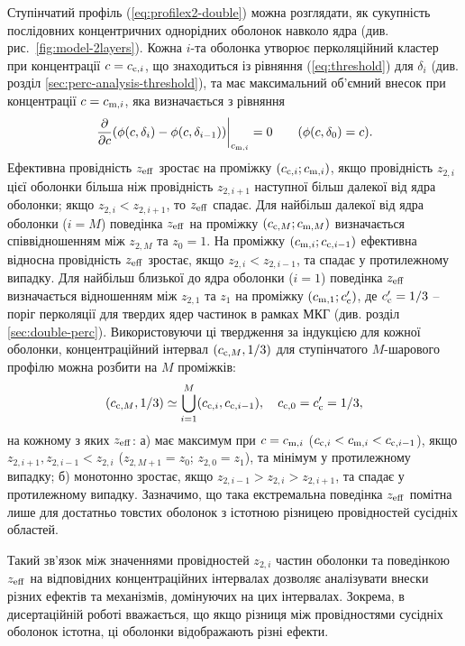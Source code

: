 \documentclass[14pt,twoside]{vakthesis}
\begin{document}
Ступінчатий профіль (\ref{eq:profilex2-double}) можна розглядати, як сукупність послідовних концентричних однорідних оболонок навколо ядра (див. рис.~\ref{fig:model-2layers}). Кожна $i$-та оболонка утворює перколяційний кластер при концентрації $c = c_{{\rm c},i}$, що знаходиться із рівняння (\ref{eq:threshold}) для $\delta_i$ (див. розділ \ref{sec:perc-analysis-threshold}), та має максимальний об'ємний внесок при концентрації $c = c_{{\rm m},i}$, яка визначається з рівняння 
$$
\left. \frac{\partial }{\partial c} (\phi(c,\delta_{i}) - \phi(c,\delta_{i-1})) \right|_{c_{{\rm m},i}} = 0 
\qquad (\phi(c, \delta_0) = c).
$$
Ефективна провідність ${z}_{\rm eff}$ зростає на проміжку $(c_{{\rm c},i}; c_{{\rm m},i})$, якщо провідність ${z}_{2,i}$ цієї оболонки більша ніж провідність ${z}_{2,i+1}$ наступної більш далекої від ядра оболонки; якщо ${z}_{2,i} < {z}_{2,i+1}$, то ${z}_{\rm eff}$ спадає. Для найбільш далекої від ядра оболонки ($i=M$) поведінка ${z}_{\rm eff}$ на проміжку $(c_{{\rm c},M}; c_{{\rm m},M})$ визначається співвідношенням між ${z}_{2,M}$ та ${z}_0 = 1$.
На проміжку $(c_{{\rm m},i}; c_{{\rm c},i-1})$ ефективна відносна провідність ${z}_{\rm eff}$ зростає, якщо ${z}_{2,i} < {z}_{2,i-1}$, та спадає у протилежному випадку. Для найбільш близької до ядра оболонки ($i=1$) поведінка $z_{\rm eff}$ визначається відношенням між ${z}_{2,1}$ та ${z}_1$ на проміжку $(c_{{\rm m},1}; c'_{{\rm c}})$, де $c_{\rm c}' = 1/3$ -- поріг перколяції для твердих ядер частинок в рамках МКГ (див. розділ \ref{sec:double-perc}).
Використовуючи ці твердження за індукцією для кожної оболонки, концентраційний інтервал $(c_{{\rm c},M}, 1/3)$ для ступінчатого $M$-шарового профілю можна розбити на $M$ проміжків: 
$$
(c_{{\rm c},M}, 1/3) \simeq \bigcup\limits_{i=1}^M (c_{{\rm c},i}, c_{{\rm c},i-1}), \quad c_{{\rm c},0} = c'_{\rm c} = 1/3,
$$ 
на кожному з яких ${z}_{\rm eff}$: а) має максимум при $c=c_{{\rm m},i}$ ($c_{{\rm c},i} < c_{{\rm m},i} < c_{{\rm c},i-1}$), якщо ${z}_{2,i+1}, {z}_{2,i-1} < {z}_{2,i}$ (${z}_{2,M+1} = {z}_0$; ${z}_{2,0} = {z}_1$), та мінімум у протилежному випадку; б) монотонно зростає, якщо ${z}_{2,i-1} > {z}_{2,i} > {z}_{2,i+1}$, та спадає у протилежному випадку. Зазначимо, що така екстремальна поведінка ${z}_{\rm eff}$ помітна лише для достатньо товстих оболонок з істотною різницею провідностей сусідніх областей.

Такий зв'язок між значеннями провідностей ${z}_{2,i}$ частин оболонки та поведінкою ${z}_{\rm eff}$ на відповідних концентраційних інтервалах дозволяє аналізувати внески різних ефектів та механізмів, домінуючих на цих інтервалах. Зокрема, в дисертаційній роботі вважається, що якщо різниця між провідностями сусідніх оболонок істотна, ці оболонки відображають різні ефекти.
\end{document}
